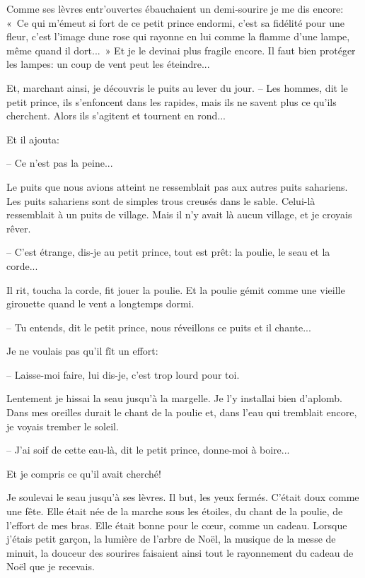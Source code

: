 \documentclass[a4paper]{report}
\begin{document}
Comme ses lèvres entr'ouvertes ébauchaient un demi-sourire je me dis encore: «~Ce qui m'émeut si fort de ce petit prince endormi, c'est sa fidélité pour une fleur, c'est l'image dune rose qui rayonne en lui comme la flamme d'une lampe, même quand il dort...~» Et je le devinai plus fragile encore. Il faut bien protéger les lampes: un coup de vent peut les éteindre...

Et, marchant ainsi, je découvris le puits au lever du jour.
\parachapter{} %
-- Les hommes, dit le petit prince, ils s'enfoncent dans les rapides, mais ils ne savent plus ce qu'ils cherchent. Alors ils s'agitent et tournent en rond...

Et il ajouta:

-- Ce n'est pas la peine...

Le puits que nous avions atteint ne ressemblait pas aux autres puits sahariens. Les puits sahariens sont de simples trous creusés dans le sable. Celui-là ressemblait à un puits de village. Mais il n'y avait là aucun village, et je croyais rêver.


-- C'est étrange, dis-je au petit prince, tout est prêt: la poulie, le seau et la corde...

Il rit, toucha la corde, fit jouer la poulie. Et la poulie gémit comme une vieille girouette quand le vent a longtemps dormi.

-- Tu entends, dit le petit prince, nous réveillons ce puits et il chante...

Je ne voulais pas qu'il fît un effort:

-- Laisse-moi faire, lui dis-je, c'est trop lourd pour toi.

Lentement je hissai la seau jusqu'à la margelle. Je l'y installai bien d'aplomb. Dans mes oreilles durait le chant de la poulie et, dans l'eau qui tremblait encore, je voyais trember le soleil.

-- J'ai soif de cette eau-là, dit le petit prince, donne-moi à boire...

Et je compris ce qu'il avait cherché!

Je soulevai le seau jusqu'à ses lèvres. Il but, les yeux fermés. C'était doux comme une fête. Elle était née de la marche sous les étoiles, du chant de la poulie, de l'effort de mes bras. Elle était bonne pour le cœur, comme un cadeau. Lorsque j'étais petit garçon, la lumière de l'arbre de Noël, la musique de la messe de minuit, la douceur des sourires faisaient ainsi tout le rayonnement du cadeau de Noël que je recevais.
\end{document}
